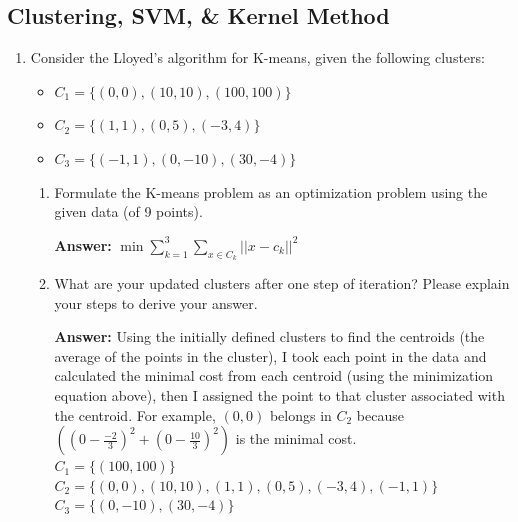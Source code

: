 \documentclass{assignment}
\date{March ??, 2024}
\begin{document}
\begin{problem}


\section{Clustering, SVM, \& Kernel Method}

\begin{enumerate}

    \item Consider the Lloyed's algorithm for K-means, given the following clusters:

    \begin{itemize}
        \item $C_1 = \{(0,0), (10,10), (100,100)\}$
        \item $C_2 = \{(1,1), (0,5), (-3,4)\}$
        \item $C_3 = \{(-1,1), (0,-10), (30,-4)\}$
    \end{itemize}
    
    \begin{enumerate}[label=(\alph*)]

    
        \item Formulate the K-means problem as an optimization problem using the given data (of 9 points).

        \color{blue}\textbf{Answer:} $\min \sum_{k=1}^3 \sum_{x \in C_k} ||x - c_k||^2$ \color{black}


        
        \item What are your updated clusters after one step of iteration? Please explain your steps to derive your answer.

        \color{blue}\textbf{Answer:} Using the initially defined clusters to find the centroids (the average of the points in the cluster), I took each point in the data and calculated the minimal cost from each centroid (using the minimization equation above), then I assigned the point to that cluster associated with the centroid. For example, $(0,0)$ belongs in $C_2$ because $((0-\frac{-2}{3})^2 + (0-\frac{10}{3})^2)$ is the minimal cost.\\
        $C_1 = \{(100,100)\}$\\
        $C_2 = \{(0,0), (10,10), (1,1), (0,5), (-3,4), (-1,1)\}$\\
        $C_3 = \{(0,-10), (30,-4)\}$
        \color{black}


\end{enumerate}
\end{enumerate}
\end{problem}
\end{document}

